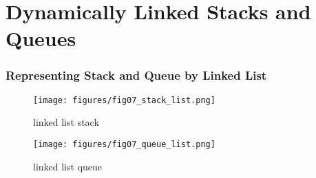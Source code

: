\documentclass[newPxFont,sthlmFooter,nooffset]{beamer}
\begin{document}
\section{Dynamically Linked Stacks and Queues}
\begin{frame}[t]
  \frametitle{Representing Stack and Queue by Linked List}
  \begin{figure}
    \centering
    \texttt{[image: figures/fig07\_stack\_list.png]}
     \caption{linked list stack}
\end{figure}
\bigskip
\begin{figure}
  \centering
  \texttt{[image: figures/fig07\_queue\_list.png]}
  \caption{linked list queue}
\end{figure}
\end{frame}
\end{document}
